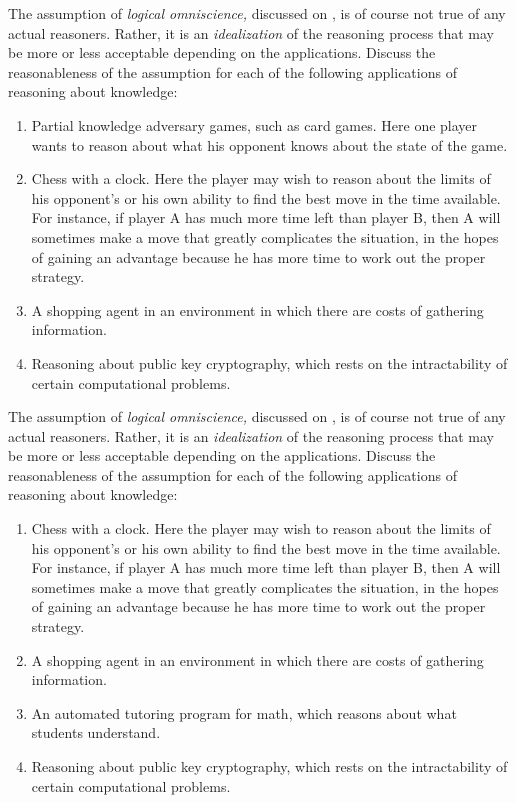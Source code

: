 \begin{uexercise}
The assumption of {\em logical omniscience,} discussed on
, is of course not true of any actual
reasoners.  Rather, it is an {\em idealization\/} of the reasoning
process that may be more or less acceptable depending on the
applications.  Discuss the reasonableness of the assumption for each
of the following applications of reasoning about knowledge:
\begin{enumerate}
\item
Partial knowledge adversary games, such as card games. Here one player wants
to reason about what his opponent knows about the state of the game. 
\item Chess with a clock.  Here the player may wish to reason about the
limits of his opponent's or his own ability to find the best move in the time
available. For instance, if player A has much more time left than player B,
then A will sometimes make a move that greatly complicates the situation,
in the hopes of gaining an advantage because he has more time to work out the
proper strategy.
\item A shopping agent in an environment in which there are costs of gathering information.
\item Reasoning about public key cryptography, which rests on the 
intractability of certain computational problems.
\end{enumerate}
\end{uexercise} 

\begin{iexercise}
The assumption of {\em logical omniscience,} discussed on
, is of course not true of any actual
reasoners.  Rather, it is an {\em idealization\/} of the reasoning
process that may be more or less acceptable depending on the
applications.  Discuss the reasonableness of the assumption for each
of the following applications of reasoning about knowledge:
\begin{enumerate}
\item Chess with a clock.  Here the player may wish to reason about the
limits of his opponent's or his own ability to find the best move in the time
available. For instance, if player A has much more time left than player B,
then A will sometimes make a move that greatly complicates the situation,
in the hopes of gaining an advantage because he has more time to work out the
proper strategy.
\item A shopping agent in an environment in which there are costs of gathering information.
\item An automated tutoring program for math, which reasons about what
students understand.
\item Reasoning about public key cryptography, which rests on the 
intractability of certain computational problems.
\end{enumerate}
\end{iexercise} 


